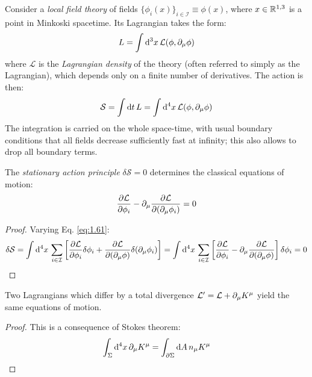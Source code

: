 Consider a \textit{local field theory} of fields $ \{\phi_i(x)\}_{i \in \mathcal{I}} \equiv \phi(x) $, where $ x \in \mathbb{R}^{1,3} $ is a point in Minkoski spacetime. Its Lagrangian takes the form:
\begin{equation}
  L = \int \mathrm{d}^3 x\, \mathcal{L}(\phi, \partial_\mu \phi)
  \label{eq:1.60}
\end{equation}
where $ \mathcal{L} $ is the \textit{Lagrangian density} of the theory (often referred to simply as the Lagrangian), which depends only on a finite number of derivatives. The action is then:
\begin{equation}
  \mathcal{S} = \int \mathrm{d} t\, L = \int \mathrm{d}^4 x\, \mathcal{L}(\phi, \partial_\mu \phi)
  \label{eq:1.61}
\end{equation}
The integration is carried on the whole space-time, with usual boundary conditions that all fields decrease sufficiently fast at infinity; this also allows to drop all boundary terms.

\begin{theorem}{}{}
  The \textit{stationary action principle} $ \delta \mathcal{S} = 0 $ determines the classical equations of motion:
  \begin{equation}
    \frac{\partial \mathcal{L}}{\partial \phi_i} - \partial_\mu \frac{\partial \mathcal{L}}{\partial (\partial_\mu \phi_i)} = 0
    \label{eq:1.62}
  \end{equation}

  \tcblower

  \begin{proof}
    Varying Eq. \ref{eq:1.61}:
    \begin{equation*}
      \delta \mathcal{S} = \int \mathrm{d}^4 x\, \sum_{i \in \mathcal{I}} \left[ \frac{\partial \mathcal{L}}{\partial \phi_i} \delta \phi_i + \frac{\partial \mathcal{L}}{\partial (\partial_\mu \phi)} \delta (\partial_\mu \phi_i) \right] = \int \mathrm{d}^4 x\, \sum_{i \in \mathcal{I}} \left[ \frac{\partial \mathcal{L}}{\partial \phi_i} - \partial_\mu \frac{\partial \mathcal{L}}{\partial (\partial_\mu \phi)} \right] \delta \phi_i = 0
    \end{equation*}
  \end{proof}
\end{theorem}

\begin{corollary}{}{}
  Two Lagrangians which differ by a total divergence $ \mathcal{L}' = \mathcal{L} + \partial_\mu K^\mu $ yield the same equations of motion.

  \tcblower

  \begin{proof}
    This is a consequence of Stokes theorem:
    \begin{equation*}
      \int_\Sigma \mathrm{d}^4 x\, \partial_\mu K^\mu = \int_{\partial \Sigma} \mathrm{d} A\, n_\mu K^\mu
    \end{equation*}
  \end{proof}
\end{corollary}

